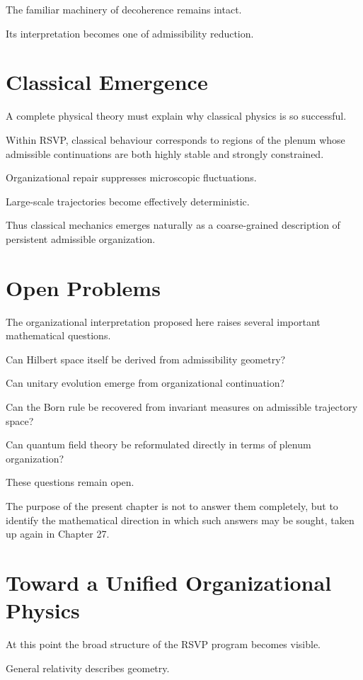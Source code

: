 \documentclass[11pt,oneside]{book}
\numberwithin{equation}{chapter}
\theoremstyle{definition}
\theoremstyle{plain}
\begin{document}
The familiar machinery of decoherence remains intact.

Its interpretation becomes one of admissibility reduction.

\section{Classical Emergence}

A complete physical theory must explain why classical physics is so
successful.

Within RSVP, classical behaviour corresponds to regions of the plenum whose
admissible continuations are both highly stable and strongly constrained.

Organizational repair suppresses microscopic fluctuations.

Large-scale trajectories become effectively deterministic.

Thus classical mechanics emerges naturally as a coarse-grained description
of persistent admissible organization.

\section{Open Problems}

The organizational interpretation proposed here raises several important
mathematical questions.

Can Hilbert space itself be derived from admissibility geometry?

Can unitary evolution emerge from organizational continuation?

Can the Born rule be recovered from invariant measures on admissible
trajectory space?

Can quantum field theory be reformulated directly in terms of plenum
organization?

These questions remain open.

The purpose of the present chapter is not to answer them completely, but to
identify the mathematical direction in which such answers may be sought,
taken up again in Chapter 27.

\section{Toward a Unified Organizational Physics}

At this point the broad structure of the RSVP program becomes visible.

General relativity describes geometry.
\end{document}
